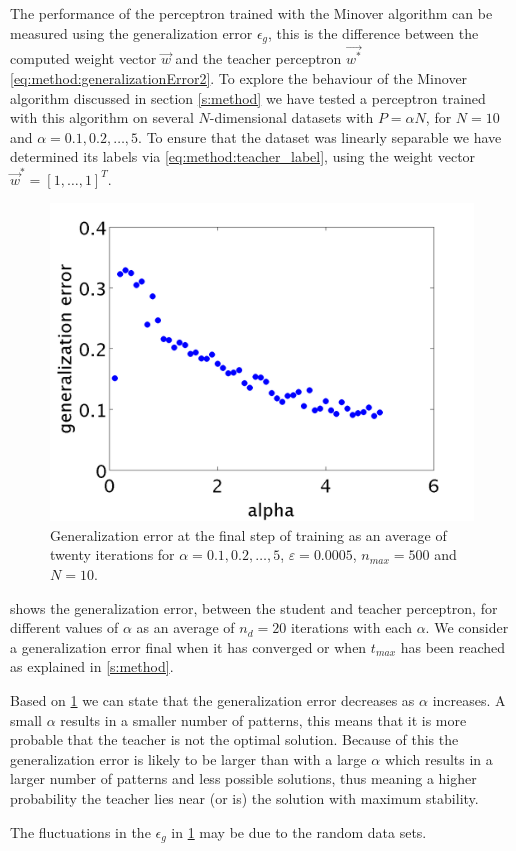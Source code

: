 The performance of the perceptron trained with the Minover algorithm can be measured using the generalization error $\epsilon_g$, this is the difference between the computed weight vector $\vec{w}$ and the teacher perceptron $\vec{w^*}$ \eqref{eq:method:generalizationError2}. To explore the behaviour of the Minover algorithm discussed in section \ref{s:method} we have tested a perceptron trained with this algorithm on several $N$-dimensional datasets with $P = \alpha N$, for $N = 10$ and $\alpha = 0.1, 0.2, \dotsc, 5$. To ensure that the dataset was linearly separable we have determined its labels via \eqref{eq:method:teacher_label}, using the weight vector $\vec{w}^* = [1, \dotsc, 1]^T$.\\

\begin{figure}[t]
	\centering
	\includegraphics[width=0.9\columnwidth]{./img/finalgeneralizationerrors}
	\caption{Generalization error at the final step of training as an average of twenty iterations for $\alpha = 0.1, 0.2, \dotsc, 5$, $\varepsilon = 0.0005$, $n_{max} = 500$ and $N = 10$.}
	\label{fig:exp:finalgeneralizationError}
\end{figure}

 shows the generalization error, between the student and teacher perceptron, for different values of $\alpha$ as an average of $n_d = 20$ iterations with each $\alpha$. We consider a generalization error final when it has converged or when $t_{max}$ has been reached as explained in \cref{s:method}. 

Based on \cref{fig:exp:finalgeneralizationError} we can state that the generalization error decreases as $\alpha$ increases. A small $\alpha$ results in a smaller number of patterns, this means that it is more probable that the teacher is not the optimal solution. Because of this the generalization error is likely to be larger than with a large $\alpha$ which results in a larger number of patterns and less possible solutions, thus meaning a higher probability the teacher lies near (or is) the solution with maximum stability.

The fluctuations in the $\epsilon_g$ in \cref{fig:exp:finalgeneralizationError} may be due to the random data sets.
